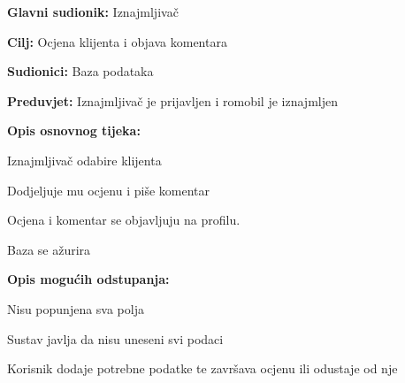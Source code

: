						\noindent {}
					\begin{packed_item}
	
						\item \textbf{Glavni sudionik: }Iznajmljivač
						\item  \textbf{Cilj: }Ocjena klijenta i objava komentara
						\item  \textbf{Sudionici: }Baza podataka
						\item  \textbf{Preduvjet: }Iznajmljivač je prijavljen i romobil je iznajmljen
						\item  \textbf{Opis osnovnog tijeka:}
						
						\item[] \begin{packed_enum}
	
							\item Iznajmljivač odabire klijenta
							\item Dodjeljuje mu ocjenu i piše komentar
							\item Ocjena i komentar se objavljuju na profilu.
							\item Baza se ažurira


						\end{packed_enum}
						
						\item  \textbf{Opis mogućih odstupanja:}
						
						\item[] \begin{packed_item}
	
							\item[2.a] Nisu popunjena sva polja
							\item[] \begin{packed_enum}
								
								\item Sustav javlja da nisu uneseni svi podaci
								\item Korisnik dodaje potrebne podatke te završava ocjenu ili odustaje od nje

							\end{packed_enum}
							
						\end{packed_item}						
					\end{packed_item}	



